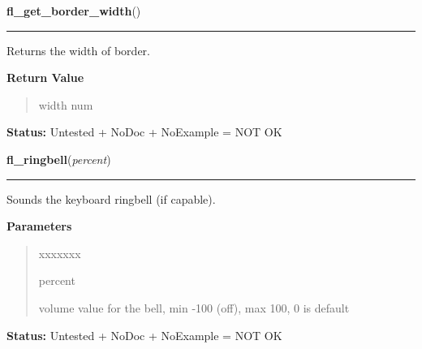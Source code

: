 \hspace{.8\funcindent}\begin{boxedminipage}{\funcwidth}

    \raggedright \textbf{fl\_get\_border\_width}()

    \vspace{-1.5ex}

    \rule{\textwidth}{0.5\fboxrule}
\setlength{\parskip}{2ex}
    Returns the width of border.

\setlength{\parskip}{1ex}
      \textbf{Return Value}
    \vspace{-1ex}

      \begin{quote}
      width num

      \end{quote}

\textbf{Status:} Untested + NoDoc + NoExample = NOT OK



    \end{boxedminipage}

    \label{xformslib:library:fl_ringbell}

    \vspace{0.5ex}

\hspace{.8\funcindent}\begin{boxedminipage}{\funcwidth}

    \raggedright \textbf{fl\_ringbell}(\textit{percent})

    \vspace{-1.5ex}

    \rule{\textwidth}{0.5\fboxrule}
\setlength{\parskip}{2ex}
    Sounds the keyboard ringbell (if capable).

\setlength{\parskip}{1ex}
      \textbf{Parameters}
      \vspace{-1ex}

      \begin{quote}
        \begin{Ventry}{xxxxxxx}

          \item[percent]

          volume value for the bell, min -100 (off), max  100, 0 is default

        \end{Ventry}

      \end{quote}

\textbf{Status:} Untested + NoDoc + NoExample = NOT OK



    \end{boxedminipage}

